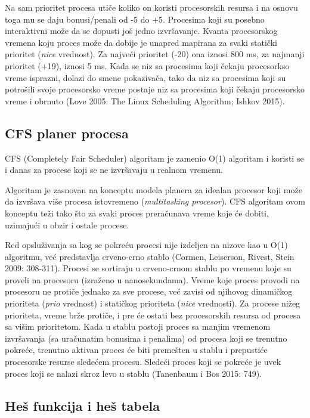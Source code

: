 Na sam prioritet procesa utiče koliko on koristi procesorskih resursa i na osnovu toga mu se daju bonusi/penali od -5 do +5. Procesima koji su posebno interaktivni može da se dopusti još jedno izvršavanje. Kvanta procesorskog vremena koju proces može da dobije je unapred mapirana za svaki statički prioritet (\emph{nice} vrednost). Za najveći prioritet (-20) ona iznosi 800 ms, za najmanji prioritet (+19), iznosi 5 ms. Kada se niz sa procesima koji čekaju procesorkso vreme isprazni, dolazi do smene pokazivača, tako da niz sa procesima koji su potrošili svoje procesorsko vreme postaje niz sa procesima koji čekaju procesorsko vreme i obrnuto (Love 2005: The Linux Scheduling Algorithm; Ishkov 2015).

\subsection{CFS planer procesa}

CFS (Completely Fair Scheduler) algoritam je zamenio O(1) algoritam i koristi se i danas za procese koji se ne izvršavaju u realnom vremenu.

Algoritam je zasnovan na konceptu modela planera za idealan procesor koji može da izvršava više procesa istovremeno (\emph{multitasking procesor}). CFS algoritam ovom konceptu teži tako što za svaki proces preračunava vreme koje će dobiti, uzimajući u obzir i ostale procese.

Red opsluživanja sa kog se pokreću procesi nije izdeljen na nizove kao u O(1) algoritmu, već predstavlja crveno-crno stablo (Cormen, Leiserson, Rivest, Stein 2009: 308-311). Procesi se sortiraju u crveno-crnom stablu po vremenu koje su proveli na procesoru (izraženo u nanosekundama). Vreme koje proces provodi na procesoru ne protiče jednako za sve procese, već zavisi od njihovog dinamičkog prioriteta (\emph{prio} vrednost) i statičkog prioriteta (\emph{nice} vrednosti). Za procese nižeg prioriteta, vreme brže protiče, i pre će ostati bez procesorskih resursa od procesa sa višim prioritetom. Kada u stablu postoji proces sa manjim vremenom izvršavanja (sa uračunatim bonusima i penalima) od procesa koji se trenutno pokreće, trenutno aktivan proces će biti premešten u stablu i prepustiće procesorske resurse sledećem procesu. Sledeći proces koji se pokreće je uvek proces koji se nalazi skroz levo u stablu (Tanenbaum i Bos 2015: 749).

\subsection{Heš funkcija i heš tabela}

